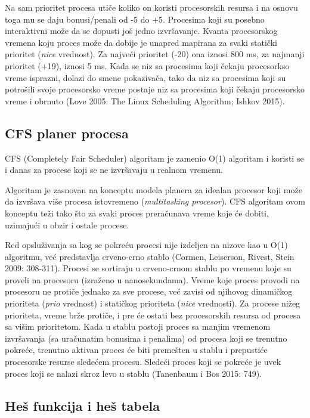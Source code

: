 Na sam prioritet procesa utiče koliko on koristi procesorskih resursa i na osnovu toga mu se daju bonusi/penali od -5 do +5. Procesima koji su posebno interaktivni može da se dopusti još jedno izvršavanje. Kvanta procesorskog vremena koju proces može da dobije je unapred mapirana za svaki statički prioritet (\emph{nice} vrednost). Za najveći prioritet (-20) ona iznosi 800 ms, za najmanji prioritet (+19), iznosi 5 ms. Kada se niz sa procesima koji čekaju procesorkso vreme isprazni, dolazi do smene pokazivača, tako da niz sa procesima koji su potrošili svoje procesorsko vreme postaje niz sa procesima koji čekaju procesorsko vreme i obrnuto (Love 2005: The Linux Scheduling Algorithm; Ishkov 2015).

\subsection{CFS planer procesa}

CFS (Completely Fair Scheduler) algoritam je zamenio O(1) algoritam i koristi se i danas za procese koji se ne izvršavaju u realnom vremenu.

Algoritam je zasnovan na konceptu modela planera za idealan procesor koji može da izvršava više procesa istovremeno (\emph{multitasking procesor}). CFS algoritam ovom konceptu teži tako što za svaki proces preračunava vreme koje će dobiti, uzimajući u obzir i ostale procese.

Red opsluživanja sa kog se pokreću procesi nije izdeljen na nizove kao u O(1) algoritmu, već predstavlja crveno-crno stablo (Cormen, Leiserson, Rivest, Stein 2009: 308-311). Procesi se sortiraju u crveno-crnom stablu po vremenu koje su proveli na procesoru (izraženo u nanosekundama). Vreme koje proces provodi na procesoru ne protiče jednako za sve procese, već zavisi od njihovog dinamičkog prioriteta (\emph{prio} vrednost) i statičkog prioriteta (\emph{nice} vrednosti). Za procese nižeg prioriteta, vreme brže protiče, i pre će ostati bez procesorskih resursa od procesa sa višim prioritetom. Kada u stablu postoji proces sa manjim vremenom izvršavanja (sa uračunatim bonusima i penalima) od procesa koji se trenutno pokreće, trenutno aktivan proces će biti premešten u stablu i prepustiće procesorske resurse sledećem procesu. Sledeći proces koji se pokreće je uvek proces koji se nalazi skroz levo u stablu (Tanenbaum i Bos 2015: 749).

\subsection{Heš funkcija i heš tabela}

